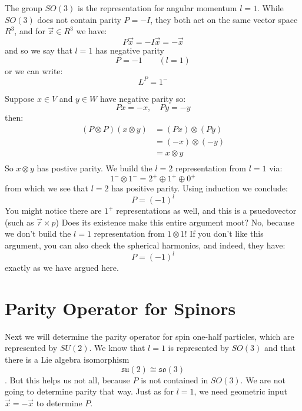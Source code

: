\documentclass[12pt]{article}
\begin{document}
The group $SO(3)$ is the representation for angular momentum $l=1$.
While $SO(3)$ does not contain parity $P=-I$, they both act on the same
vector space $R^3$, and for $\vec{x} \in R^3$ we have:
$$P\vec{x} = -I \vec{x} = -\vec{x}$$
and so we say that $l=1$ has negative parity
$$P = -1 \quad \quad (l=1)$$
or we can write:
$$L^P=1^-$$

Suppose $x \in V$ and $y \in W$ have negative parity so:
$$Px = -x, \quad Py = -y$$
then:
\begin{align}
(P \otimes P)(x \otimes y) &= (Px) \otimes (Py) \\
  &= (-x) \otimes (-y) \\
  &= x \otimes y \\
\end{align}
So $x \otimes y$ has postive parity.  We build the $l=2$
representation from $l=1$ via:
$$1^- \otimes 1^- = 2^+ \oplus 1^+ \oplus 0^+ $$
from which we see that $l=2$ has positive parity.  Using induction we conclude:
$$P=(-1)^l$$
You might notice there are $1^+$ representations as well, and this is
a psuedovector (such as $\vec{r} \times {p}$) Does its existence make
this entire argument moot?  No, because we don't build the $l=1$ representation from
$1\otimes1$!
If you don't like this argument, you can also check the spherical harmonics, and indeed, they have:
$$P=(-1)^l$$
exactly as we have argued here.

\section*{Parity Operator for Spinors}

Next we will determine the parity operator for spin one-half
particles, which are represented by $SU(2)$.  We know that $l=1$ is
represented by $SO(3)$ and that there is a Lie algebra
isomorphism $$\mathfrak{su}(2) \cong \mathfrak{so}(3)$$.  But this
helps us not all, because $P$ is not contained in $SO(3)$.  We are not
going to determine parity that way.  Just as for $l=1$, we need
geometric input $\vec{x}=-\vec{x}$ to determine $P$.
\end{document}
